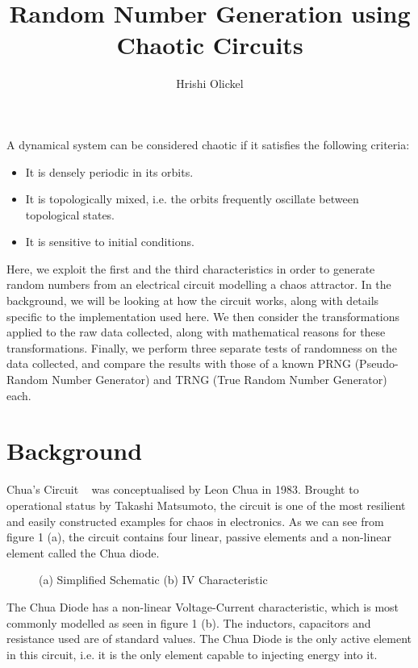 \documentclass[jou,apacite]{apa6}
\title{Random Number Generation using Chaotic Circuits}
\author{Hrishi Olickel}
\affiliation{Yale-NUS College}
\begin{document}
\maketitle

A dynamical system can be considered chaotic if it satisfies the following criteria:
\begin{itemize}
\item It is densely periodic in its orbits.
\item It is topologically mixed, i.e. the orbits frequently oscillate between topological states.
\item It is sensitive to initial conditions.
\end{itemize}
Here, we exploit the first and the third characteristics in order to generate random numbers from an electrical circuit modelling a chaos attractor. In the background, we will be looking at how the circuit works, along with details specific to the implementation used here. We then consider the transformations applied to the raw data collected, along with mathematical reasons for these transformations. Finally, we perform three separate tests of randomness on the data collected, and compare the results with those of a known PRNG (Pseudo-Random Number Generator) and TRNG (True Random Number Generator) each.

\section{Background}

Chua's Circuit ~\cite{mats} was conceptualised by Leon Chua in 1983. Brought to operational status by Takashi Matsumoto, the circuit is one of the most resilient and easily constructed examples for chaos in electronics. As we can see from figure 1 (a), the circuit contains four linear, passive elements and a non-linear element called the Chua diode. 

\begin{figure}[H]
\caption{(a) Simplified Schematic (b) IV Characteristic}
\endminipage\hfill
{}
\endminipage
\end{figure}

The Chua Diode has a non-linear Voltage-Current characteristic, which is most commonly modelled as seen in figure 1 (b). The inductors, capacitors and resistance used are of standard values. The Chua Diode is the only active element in this circuit, i.e. it is the only element capable to injecting energy into it.
\end{document}
